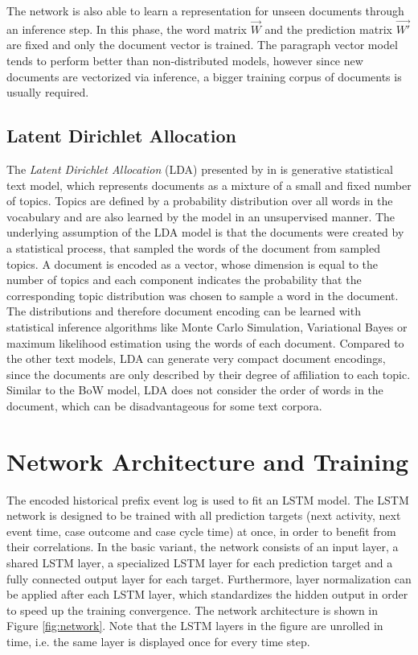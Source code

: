 The network is also able to learn a representation for unseen documents through an inference step.
In this phase, the word matrix $\vec{W}$ and the prediction matrix $\vec{W'}$ are fixed and only the document vector is trained.
The paragraph vector model tends to perform better than non-distributed models, however since new documents are vectorized via inference, a bigger training corpus of documents is usually required.

\subsection{Latent Dirichlet Allocation}\label{sec:lda}

The \textit{Latent Dirichlet Allocation} (LDA) presented by \citeauthor{DBLP:journals/jmlr/BleiNJ03} in \citeyear{DBLP:journals/jmlr/BleiNJ03} \cite{DBLP:journals/jmlr/BleiNJ03} is generative statistical text model, which represents documents as a mixture of a small and fixed number of topics.
Topics are defined by a probability distribution over all words in the vocabulary and are also learned by the model in an unsupervised manner.
The underlying assumption of the LDA model is that the documents were created by a statistical process, that sampled the words of the document from sampled topics.
A document is encoded as a vector, whose dimension is equal to the number of topics and each component indicates the probability that the corresponding topic distribution was chosen to sample a word in the document.
The distributions and therefore document encoding can be learned with statistical inference algorithms like Monte Carlo Simulation, Variational Bayes or maximum likelihood estimation using the words of each document.
Compared to the other text models, LDA can generate very compact document encodings, since the documents are only described by their degree of affiliation to each topic.
Similar to the BoW model, LDA does not consider the order of words in the document, which can be disadvantageous for some text corpora.

\section{Network Architecture and Training}
The encoded historical prefix event log is used to fit an LSTM model.
The LSTM network is designed to be trained with all prediction targets (next activity, next event time, case outcome and case cycle time) at once, in order to benefit from their correlations.
In the basic variant, the network consists of an input layer, a shared LSTM layer, a specialized LSTM layer for each prediction target and a fully connected output layer for each target.
Furthermore, layer normalization \cite{DBLP:journals/corr/BaKH16} can be applied after each LSTM layer, which standardizes the hidden output in order to speed up the training convergence.
The network architecture is shown in Figure \ref{fig:network}.
Note that the LSTM layers in the figure are unrolled in time, i.e. the same layer is displayed once for every time step.

